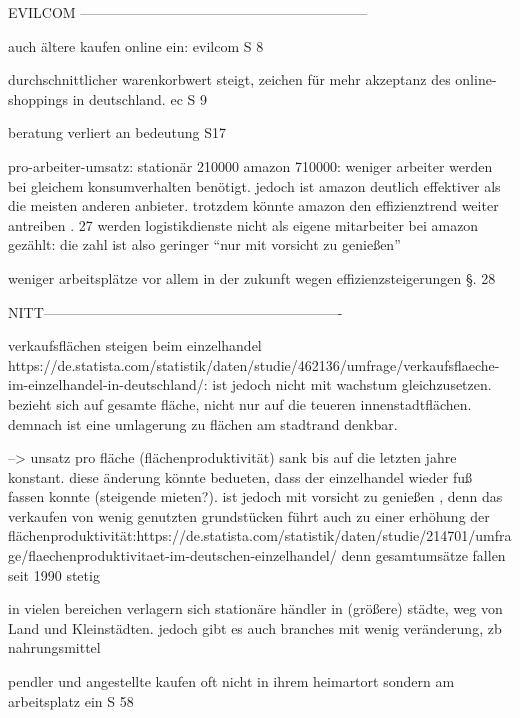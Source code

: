 \iffalse 

        EVILCOM --------------------------------------------------------------
        
        auch ältere kaufen online ein: evilcom S 8
        
        durchschnittlicher warenkorbwert steigt, zeichen für mehr akzeptanz des online-shoppings in deutschland. ec S 9
        
        beratung verliert an bedeutung S17
        
        pro-arbeiter-umsatz: stationär 210000 amazon 710000: weniger arbeiter werden bei gleichem konsumverhalten benötigt. jedoch ist amazon deutlich effektiver als die meisten anderen anbieter. trotzdem könnte amazon den effizienztrend weiter antreiben \s. 27 werden logistikdienste nicht als eigene mitarbeiter bei amazon gezählt: die zahl ist also geringer ``nur mit vorsicht zu genießen''
        
        weniger arbeitsplätze vor allem in der zukunft wegen effizienzsteigerungen \S. 28
        
        
        NITT----------------------------------------------------------------
        
        verkaufsflächen steigen beim einzelhandel https://de.statista.com/statistik/daten/studie/462136/umfrage/verkaufsflaeche-im-einzelhandel-in-deutschland/: ist jedoch nicht mit wachstum gleichzusetzen. bezieht sich auf gesamte fläche, nicht nur auf die teueren innenstadtflächen. demnach ist eine umlagerung zu flächen am stadtrand denkbar.
        
        --> unsatz pro fläche (flächenproduktivität) sank bis auf die letzten jahre konstant. diese änderung könnte bedueten, dass der einzelhandel wieder fuß fassen konnte (steigende mieten?). ist jedoch mit vorsicht zu genießen , denn das verkaufen von wenig genutzten grundstücken führt auch zu einer erhöhung der flächenproduktivität:https://de.statista.com/statistik/daten/studie/214701/umfrage/flaechenproduktivitaet-im-deutschen-einzelhandel/
        denn gesamtumsätze fallen seit 1990 stetig\cite[S. 6]{Nitt}
        
        in vielen bereichen verlagern sich stationäre händler in (größere) städte, weg von Land und Kleinstädten. jedoch gibt es auch branches mit wenig veränderung, zb nahrungsmittel
        
        pendler und angestellte kaufen oft nicht in ihrem heimartort sondern am arbeitsplatz ein S 58
    
    
    
